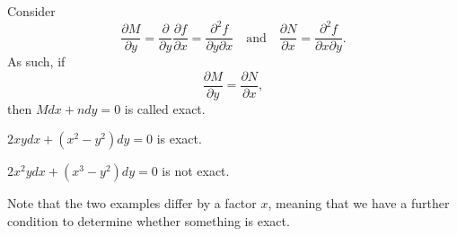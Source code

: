 \documentclass[../main/main.tex]{subfiles}
\begin{document}
Consider \[
\frac{\partial M}{\partial y} = \frac{\partial }{\partial y} \frac{\partial f}{\partial x} =\frac{\partial ^2f}{\partial y\partial x} \quad \text{and}\quad \frac{\partial N}{\partial x} =\frac{\partial ^2f}{\partial x\partial y} 
.\]  As such, if  \[
\frac{\partial M}{\partial y} =\frac{\partial N}{\partial x} 
,\] then $Mdx+ndy=0$ is called exact. 
\begin{example}
	$2xydx+(x^2-y^2)dy=0$ is exact.
\end{example}
\begin{example}
	$2x^2ydx+(x^{3}-y^2)dy=0$ is not exact.
\end{example}
Note that the two examples differ by a factor $x$, meaning that we have a further condition to determine whether something is exact.

\end{document}
